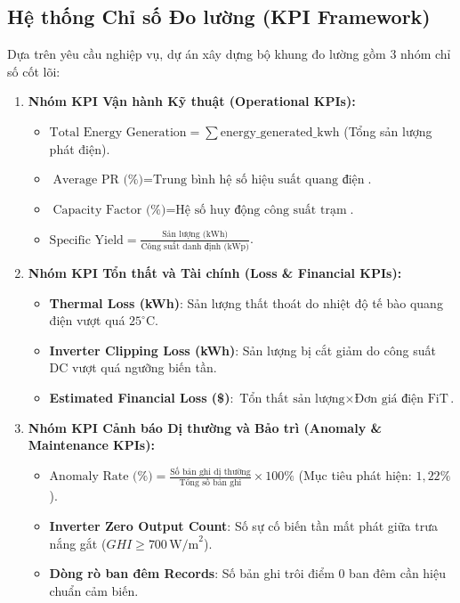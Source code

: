 \documentclass[12pt, a4paper]{report}
\begin{document}
\subsection{Hệ thống Chỉ số Đo lường (KPI Framework)}
Dựa trên yêu cầu nghiệp vụ, dự án xây dựng bộ khung đo lường gồm 3 nhóm chỉ số cốt lõi:
\begin{enumerate}[label=\arabic*., leftmargin=*]
    \item \textbf{Nhóm KPI Vận hành Kỹ thuật (Operational KPIs):}
    \begin{itemize}[noitemsep]
        \item $\text{Total Energy Generation} = \sum \text{energy\_generated\_kwh}$ (Tổng sản lượng phát điện).
        \item $\text{Average PR (\%)} = \text{Trung bình hệ số hiệu suất quang điện}$.
        \item $\text{Capacity Factor (\%)} = \text{Hệ số huy động công suất trạm}$.
        \item $\text{Specific Yield} = \frac{\text{Sản lượng (kWh)}}{\text{Công suất danh định (kWp)}}$.
    \end{itemize}
    \item \textbf{Nhóm KPI Tổn thất và Tài chính (Loss \& Financial KPIs):}
    \begin{itemize}[noitemsep]
        \item \textbf{Thermal Loss (kWh)}: Sản lượng thất thoát do nhiệt độ tế bào quang điện vượt quá $25^\circ\text{C}$.
        \item \textbf{Inverter Clipping Loss (kWh)}: Sản lượng bị cắt giảm do công suất DC vượt quá ngưỡng biến tần.
        \item \textbf{Estimated Financial Loss (\$)}: $\text{Tổn thất sản lượng} \times \text{Đơn giá điện FiT}$.
    \end{itemize}
    \item \textbf{Nhóm KPI Cảnh báo Dị thường và Bảo trì (Anomaly \& Maintenance KPIs):}
    \begin{itemize}[noitemsep]
        \item $\text{Anomaly Rate (\%)} = \frac{\text{Số bản ghi dị thường}}{\text{Tổng số bản ghi}} \times 100\%$ (Mục tiêu phát hiện: $1{,}22\%$).
        \item \textbf{Inverter Zero Output Count}: Số sự cố biến tần mất phát giữa trưa nắng gắt ($GHI \ge 700\,\text{W/m}^2$).
        \item \textbf{Dòng rò ban đêm Records}: Số bản ghi trôi điểm 0 ban đêm cần hiệu chuẩn cảm biến.
    \end{itemize}
\end{enumerate}
\end{document}
